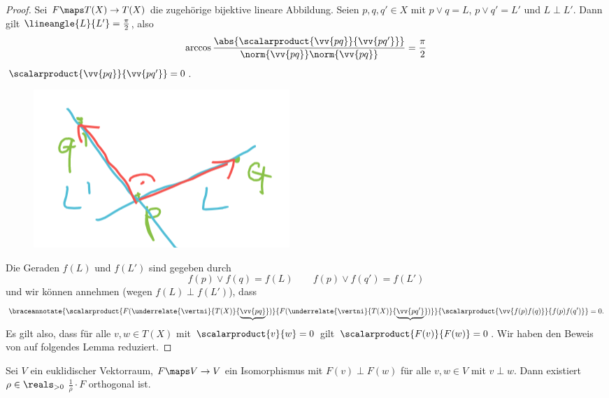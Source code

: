 \begin{proof}
  Sei \( F\maps T(X)\to T(X) \) die zugehörige bijektive lineare Abbildung. Seien \( p,q,q'\in X \) mit \( p\vee q=L \), \( p\vee q'=L' \) und \( L\perp L' \). Dann gilt \( \lineangle{L}{L'}=\frac{\pi}{2} \), also
  \begin{equation*}
    \arccos \frac{\abs{\scalarproduct{\vv{pq}}{\vv{pq'}}}}{\norm{\vv{pq}}\norm{\vv{pq}}}=\frac{\pi}{2}
  \end{equation*}
  \dh \( \scalarproduct{\vv{pq}}{\vv{pq'}}=0 \).
  \begin{figure}[H]
    \centering
    \includegraphics[width=0.5\linewidth]{figures/rechte_winkel_skalarprodukt}
    \label{fig:rechte_winkel_skalarprodukt}
  \end{figure}
  Die Geraden \( f(L) \) und \( f(L') \) sind gegeben durch
  \begin{equation*}
    f(p)\vee f(q)=f(L)\qquad f(p)\vee f(q')=f(L')
  \end{equation*}
  und wir können annehmen (wegen \( f(L)\perp f(L') \)), dass 
  \begin{equation*}
    \braceannotate{\scalarproduct{F(\underrelate{\vertni}{T(X)}{\underbrace{\vv{pq}}})}{F(\underrelate{\vertni}{T(X)}{\underbrace{\vv{pq'}}})}}{\scalarproduct{\vv{f(p)f(q)}}{f(p)f(q')}}=0.
  \end{equation*}
Es gilt also, dass für alle \( v,w\in T(X) \) mit \( \scalarproduct{v}{w}=0 \) gilt \( \scalarproduct{F(v)}{F(w)}=0 \). Wir haben den Beweis von  auf folgendes Lemma reduziert.
\end{proof}
\begin{lemma}
  Sei \( V \) ein euklidischer Vektorraum, \( F\maps V\to V  \) ein Isomorphismus mit \( F(v)\perp F(w) \) für alle \( v,w\in V \) mit \( v\perp w \). Dann existiert \( \rho\in \reals_{>0} \) \sd \( \frac{1}{\rho}\cdot F \) orthogonal ist.
\end{lemma}
